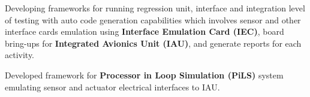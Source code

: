 \begin{cventries}
{\begin{cvitems}
			\item{\large Developing frameworks for running regression unit, interface and integration level of testing with auto code generation capabilities which involves sensor and other interface cards emulation using \textbf{Interface Emulation Card (IEC)}\href{http://zedboard.org/product/microzed/}, board bring-ups for \textbf{Integrated Avionics Unit (IAU)}, and generate reports for each activity.}
			\item{\large Developed framework for \textbf{Processor in Loop Simulation (PiLS)} system emulating sensor and actuator electrical interfaces to IAU.}
		\end{cvitems}
	}
\end{cventries}
